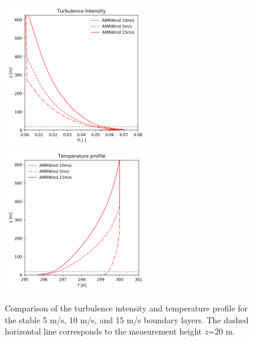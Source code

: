 \begin{figure}[hbt!]
  \centering
  \includegraphics[width=2.5in]{figures/AMRWind_allWS/AMRWind_stable_TI.png}
  \includegraphics[width=2.5in]{figures/AMRWind_allWS/AMRWind_stable_T.png}
  \caption{ \label{fig:CompareAMRallTTI} Comparison of the turbulence
    intensity and temperature profile for the stable 5 m/s, 10 m/s,
    and 15 m/s boundary layers. The dashed horizontal line corresponds
    to the measurement height $z$=20 m.}
\end{figure}



